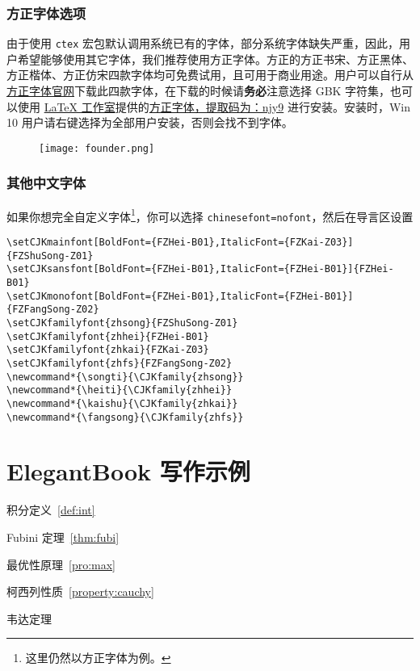 \documentclass[cn,10pt,math=newtx,citestyle=gb7714-2015,bibstyle=gb7714-2015]{elegantbook}
\begin{document}
\subsection{方正字体选项}
由于使用 \lstinline{ctex} 宏包默认调用系统已有的字体，部分系统字体缺失严重，因此，用户希望能够使用其它字体，我们推荐使用方正字体。方正的{\songti 方正书宋}、{\heiti 方正黑体}、{\kaishu 方正楷体}、{\fangsong 方正仿宋}四款字体均可免费试用，且可用于商业用途。用户可以自行从\href{http://www.foundertype.com/}{方正字体官网}下载此四款字体，在下载的时候请\textbf{务必}注意选择 GBK 字符集，也可以使用 \href{https://www.latexstudio.net/}{\LaTeX{} 工作室}提供的\href{https://pan.baidu.com/s/1BgbQM7LoinY7m8yeP25Y7Q}{方正字体，提取码为：njy9} 进行安装。安装时，{\kaishu Win 10 用户请右键选择为全部用户安装，否则会找不到字体。}

\begin{figure}[!htb]
\centering
\texttt{[image: founder.png]}
\end{figure}

\subsection{其他中文字体}
如果你想完全自定义字体\footnote{这里仍然以方正字体为例。}，你可以选择 \lstinline{chinesefont=nofont}，然后在导言区设置
\begin{lstlisting}
\setCJKmainfont[BoldFont={FZHei-B01},ItalicFont={FZKai-Z03}]{FZShuSong-Z01}
\setCJKsansfont[BoldFont={FZHei-B01},ItalicFont={FZHei-B01}]{FZHei-B01}
\setCJKmonofont[BoldFont={FZHei-B01},ItalicFont={FZHei-B01}]{FZFangSong-Z02}
\setCJKfamilyfont{zhsong}{FZShuSong-Z01}
\setCJKfamilyfont{zhhei}{FZHei-B01}
\setCJKfamilyfont{zhkai}{FZKai-Z03}
\setCJKfamilyfont{zhfs}{FZFangSong-Z02}
\newcommand*{\songti}{\CJKfamily{zhsong}}
\newcommand*{\heiti}{\CJKfamily{zhhei}}
\newcommand*{\kaishu}{\CJKfamily{zhkai}}
\newcommand*{\fangsong}{\CJKfamily{zhfs}}
\end{lstlisting}

\chapter{ElegantBook 写作示例}

\begin{introduction}
  \item 积分定义~\ref{def:int}
  \item Fubini 定理~\ref{thm:fubi}
  \item 最优性原理~\ref{pro:max}
  \item 柯西列性质~\ref{property:cauchy}
  \item 韦达定理
\end{introduction}
\end{document}
